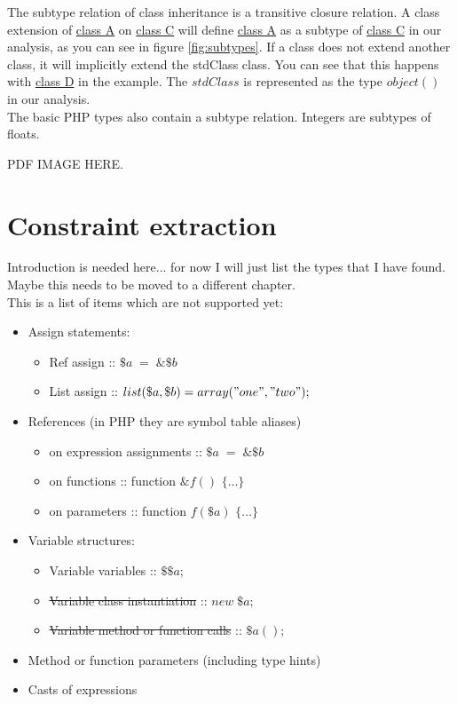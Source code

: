\documentclass[../main.tex]{subfiles}
\begin{document}
    The subtype relation of class inheritance is a \gls{transitive closure} relation.
    A class extension of \underline{class A} on \underline{class C} will define \underline{class A} as a subtype of \underline{class C} in our analysis, as you can see in figure \ref{fig:subtypes}.
    If a class does not extend another class, it will implicitly extend the \gls{stdClass} class.
    You can see that this happens with \underline{class D} in the example.
    The $stdClass$ is represented as the type $object()$ in our analysis.
    \\
    The basic PHP types also contain a subtype relation.
    Integers are subtypes of floats.
    
    PDF IMAGE HERE.
    
    \section{Constraint extraction}
       
    Introduction is needed here... for now I will just list the types that I have found.
    Maybe this needs to be moved to a different chapter.
    \\
    This is a list of items which are not supported yet:

    \begin{itemize}
        \item Assign statements:
        \begin{itemize}
            \item Ref assign :: $\$a \; = \; \&\$b$
            \item List assign :: $list(\$a, \$b) = array("one", "two");$
        \end{itemize}
        
        \item References (in PHP they are symbol table aliases)
        \begin{itemize}
            \item on expression assignments :: $\$a \; = \; \&\$b$
            \item on functions :: function $\&f()$ $\{ \dots \}$
            \item on parameters :: function $f(\$a)$ $\{ \dots \}$             
        \end{itemize}

        \item Variable structures:
        \begin{itemize}
            \item Variable variables :: $\$\$a;$
            \item \sout{Variable class instantiation} :: $new \; \$a;$
            \item \sout{Variable method or function calls} :: $\$a();$
        \end{itemize}
        
        \item Method or function parameters (including type hints)
        
        \item Casts of expressions
        
        
    \end{itemize}
\end{document}
